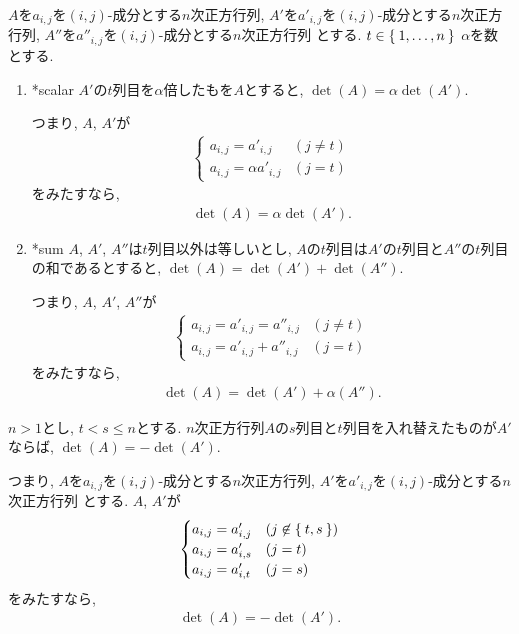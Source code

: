 \begin{theorem}
  $A$を$a_{i,j}$を$(i,j)$-成分とする$n$次正方行列,
  $A'$を$a'_{i,j}$を$(i,j)$-成分とする$n$次正方行列,
  $A''$を$a''_{i,j}$を$(i,j)$-成分とする$n$次正方行列
  とする.
  $t\in\Set{1,\ldots,n}$
  $\alpha$を数とする.
  \begin{enumerate}
  \item
    \provelater**{scalar}
    $A'$の$t$列目を$\alpha$倍したもを$A$とすると,
    $\det(A)=\alpha\det(A')$.

    つまり,
    $A$, $A'$が
    \begin{align*}
      \begin{cases}
        a_{i,j}=a'_{i,j} & (j\neq t)\\
        a_{i,j}=\alpha a'_{i,j} & (j = t)
      \end{cases}
    \end{align*}
    をみたすなら,
    \begin{align*}
      \det(A)=\alpha\det(A').
    \end{align*}
  \item
    \provelater**{sum}
    $A$, $A'$, $A''$は$t$列目以外は等しいとし,
    $A$の$t$列目は$A'$の$t$列目と$A''$の$t$列目の和であるとすると,
    $\det(A)=\det(A')+\det(A'')$.

    つまり,
    $A$, $A'$, $A''$が
    \begin{align*}
      \begin{cases}
        a_{i,j}=a'_{i,j} = a''_{i,j} & (j\neq t)\\
        a_{i,j}=a'_{i,j} + a''_{i,j} & (j = t)
      \end{cases}
    \end{align*}
    をみたすなら,
    \begin{align*}
      \det(A)=\det(A')+\alpha(A'').
    \end{align*}
  \end{enumerate}
\end{theorem}


\begin{theorem}
  $n>1$とし, $t<s\leq n$とする. 
  $n$次正方行列$A$の$s$列目と$t$列目を入れ替えたものが$A'$ならば,
  $\det(A)=-\det(A')$.

  つまり, 
  $A$を$a_{i,j}$を$(i,j)$-成分とする$n$次正方行列,
  $A'$を$a'_{i,j}$を$(i,j)$-成分とする$n$次正方行列
  とする.
  $A$, $A'$が
  \begin{align*}
    \begin{cases}
      a_{i,j}=a'_{i,j} & (j\not\in \Set{t,s})\\
      a_{i,j}=a'_{i,s} & (j = t)\\
      a_{i,j}=a'_{i,t} & (j = s)
    \end{cases}
  \end{align*}
  をみたすなら,
  \begin{align*}
    \det(A)=-\det(A').
  \end{align*}
\end{theorem}


